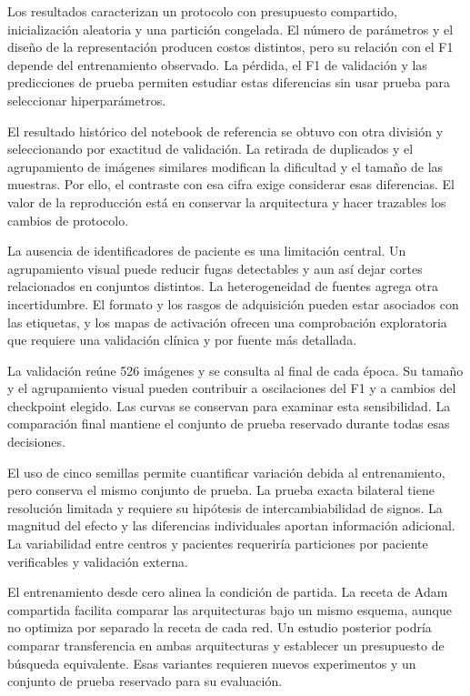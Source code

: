 Los resultados caracterizan un protocolo con presupuesto compartido, inicialización aleatoria y una partición congelada. El número de parámetros y el diseño de la representación producen costos distintos, pero su relación con el F1 depende del entrenamiento observado. La pérdida, el F1 de validación y las predicciones de prueba permiten estudiar estas diferencias sin usar prueba para seleccionar hiperparámetros.

El resultado histórico del notebook de referencia se obtuvo con otra división y seleccionando por exactitud de validación. La retirada de duplicados y el agrupamiento de imágenes similares modifican la dificultad y el tamaño de las muestras. Por ello, el contraste con esa cifra exige considerar esas diferencias. El valor de la reproducción está en conservar la arquitectura y hacer trazables los cambios de protocolo.

La ausencia de identificadores de paciente es una limitación central. Un agrupamiento visual puede reducir fugas detectables y aun así dejar cortes relacionados en conjuntos distintos. La heterogeneidad de fuentes agrega otra incertidumbre. El formato y los rasgos de adquisición pueden estar asociados con las etiquetas, y los mapas de activación ofrecen una comprobación exploratoria que requiere una validación clínica y por fuente más detallada.

La validación reúne 526 imágenes y se consulta al final de cada época. Su tamaño y el agrupamiento visual pueden contribuir a oscilaciones del F1 y a cambios del checkpoint elegido. Las curvas se conservan para examinar esta sensibilidad. La comparación final mantiene el conjunto de prueba reservado durante todas esas decisiones.

El uso de cinco semillas permite cuantificar variación debida al entrenamiento, pero conserva el mismo conjunto de prueba. La prueba exacta bilateral tiene resolución limitada y requiere su hipótesis de intercambiabilidad de signos. La magnitud del efecto y las diferencias individuales aportan información adicional. La variabilidad entre centros y pacientes requeriría particiones por paciente verificables y validación externa.

El entrenamiento desde cero alinea la condición de partida. La receta de Adam compartida facilita comparar las arquitecturas bajo un mismo esquema, aunque no optimiza por separado la receta de cada red. Un estudio posterior podría comparar transferencia en ambas arquitecturas y establecer un presupuesto de búsqueda equivalente. Esas variantes requieren nuevos experimentos y un conjunto de prueba reservado para su evaluación.

